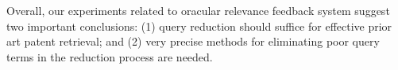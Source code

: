 
Overall, our experiments related to oracular relevance feedback system
suggest two important conclusions: (1) query reduction should suffice for effective prior art patent retrieval; and (2) very precise methods for eliminating poor query terms in the reduction process are needed.


